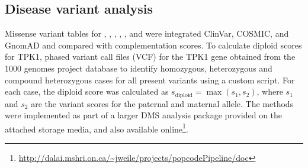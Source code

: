 \subsection{Disease variant analysis}
Missense variant tables for , , , , ,  and  were integrated ClinVar, COSMIC, and GnomAD and compared with complementation scores. To calculate diploid scores for TPK1, phased variant call files (VCF) for the TPK1 gene obtained from the 1000 genomes project database to identify homozygous, heterozygous and compound heterozygous cases for all present variants using a custom script. For each case, the diploid score was calculated as $s_\text{diploid} = \max(s_1,s_2)$, where $s_1$ and $s_2$ are the variant scores for the paternal and maternal allele. The methods were implemented as part of a larger DMS analysis package provided on the attached storage media, and also available online\footnote{\url{http://dalai.mshri.on.ca/~jweile/projects/popcodePipeline/doc}}.